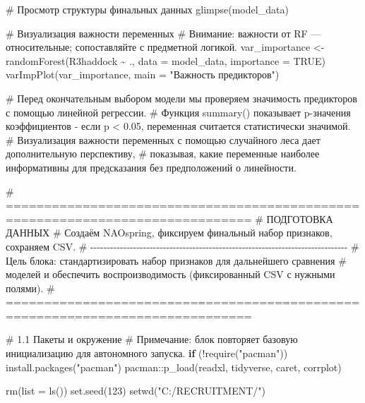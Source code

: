 \documentclass[
  letterpaper,
  DIV=11,
  numbers=noendperiod]{scrreprt}
\newenvironment{Shaded}{\begin{snugshade}}{\end{snugshade}}
\newcommand{\AttributeTok}[1]{\textcolor[rgb]{0.40,0.45,0.13}{#1}}
\newcommand{\CommentTok}[1]{\textcolor[rgb]{0.37,0.37,0.37}{#1}}
\newcommand{\ConstantTok}[1]{\textcolor[rgb]{0.56,0.35,0.01}{#1}}
\newcommand{\ControlFlowTok}[1]{\textcolor[rgb]{0.00,0.23,0.31}{\textbf{#1}}}
\newcommand{\DecValTok}[1]{\textcolor[rgb]{0.68,0.00,0.00}{#1}}
\newcommand{\FunctionTok}[1]{\textcolor[rgb]{0.28,0.35,0.67}{#1}}
\newcommand{\NormalTok}[1]{\textcolor[rgb]{0.00,0.23,0.31}{#1}}
\newcommand{\OtherTok}[1]{\textcolor[rgb]{0.00,0.23,0.31}{#1}}
\newcommand{\SpecialCharTok}[1]{\textcolor[rgb]{0.37,0.37,0.37}{#1}}
\newcommand{\StringTok}[1]{\textcolor[rgb]{0.13,0.47,0.30}{#1}}
\begin{document}
\begin{Shaded}
\begin{Highlighting}[]
\CommentTok{\# Просмотр структуры финальных данных}
\FunctionTok{glimpse}\NormalTok{(model\_data)}

\CommentTok{\# Визуализация важности переменных}
\CommentTok{\# Внимание: важности от RF — относительные; сопоставляйте с предметной логикой.}
\NormalTok{var\_importance }\OtherTok{\textless{}{-}} \FunctionTok{randomForest}\NormalTok{(R3haddock }\SpecialCharTok{\textasciitilde{}}\NormalTok{ ., }\AttributeTok{data =}\NormalTok{ model\_data, }\AttributeTok{importance =} \ConstantTok{TRUE}\NormalTok{)}
\FunctionTok{varImpPlot}\NormalTok{(var\_importance, }\AttributeTok{main =} \StringTok{"Важность предикторов"}\NormalTok{)}

\CommentTok{\# Перед окончательным выбором модели мы проверяем значимость предикторов с помощью линейной регрессии.}
\CommentTok{\# Функция summary() показывает p{-}значения коэффициентов {-} если p \textless{} 0.05, переменная считается статистически значимой. }
\CommentTok{\# Визуализация важности переменных с помощью случайного леса дает дополнительную перспективу,}
\CommentTok{\# показывая, какие переменные наиболее информативны для предсказания без предположений о линейности.}

\CommentTok{\# ==============================================================================}
\CommentTok{\#  ПОДГОТОВКА ДАННЫХ}
\CommentTok{\# Создаём NAOspring, фиксируем финальный набор признаков, сохраняем CSV.}
\CommentTok{\# {-}{-}{-}{-}{-}{-}{-}{-}{-}{-}{-}{-}{-}{-}{-}{-}{-}{-}{-}{-}{-}{-}{-}{-}{-}{-}{-}{-}{-}{-}{-}{-}{-}{-}{-}{-}{-}{-}{-}{-}{-}{-}{-}{-}{-}{-}{-}{-}{-}{-}{-}{-}{-}{-}{-}{-}{-}{-}{-}{-}{-}{-}{-}{-}{-}{-}{-}{-}{-}{-}{-}{-}{-}{-}{-}{-}{-}{-}}
\CommentTok{\# Цель блока: стандартизировать набор признаков для дальнейшего сравнения}
\CommentTok{\# моделей и обеспечить воспроизводимость (фиксированный CSV с нужными полями).}
\CommentTok{\# ==============================================================================}

\CommentTok{\# 1.1 Пакеты и окружение}
\CommentTok{\# Примечание: блок повторяет базовую инициализацию для автономного запуска.}
\ControlFlowTok{if}\NormalTok{ (}\SpecialCharTok{!}\FunctionTok{require}\NormalTok{(}\StringTok{"pacman"}\NormalTok{)) }\FunctionTok{install.packages}\NormalTok{(}\StringTok{"pacman"}\NormalTok{)}
\NormalTok{pacman}\SpecialCharTok{::}\FunctionTok{p\_load}\NormalTok{(readxl, tidyverse, caret, corrplot)}

\FunctionTok{rm}\NormalTok{(}\AttributeTok{list =} \FunctionTok{ls}\NormalTok{())}
\FunctionTok{set.seed}\NormalTok{(}\DecValTok{123}\NormalTok{)}
\FunctionTok{setwd}\NormalTok{(}\StringTok{"C:/RECRUITMENT/"}\NormalTok{)}


\end{Highlighting}
\end{Shaded}
\end{document}
